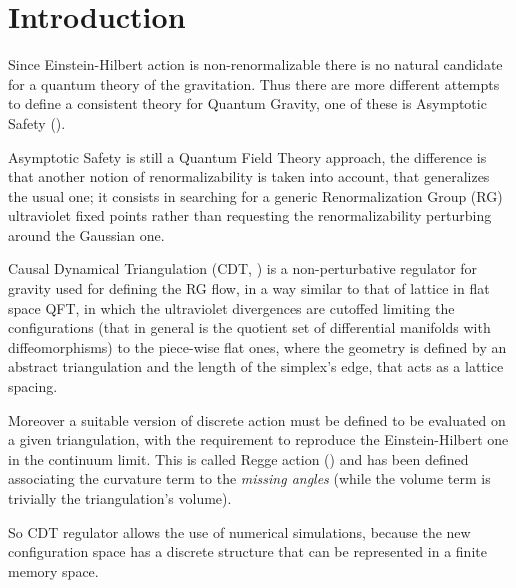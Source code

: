 
\cleardoublepage
{}

\chapter*{Introduction}
%
	{}


\indent Since Einstein-Hilbert action is non-renormalizable there is no natural candidate for a quantum theory of the gravitation. Thus there are more different attempts to define a consistent theory for Quantum Gravity, one of these is Asymptotic Safety (\cite{Weinberg1979}).
\newline

\indent Asymptotic Safety is still a Quantum Field Theory approach, the difference  is that another notion of renormalizability is taken into account, that generalizes the usual one; it consists in searching for a generic Renormalization Group (RG) ultraviolet fixed points rather than requesting the renormalizability perturbing around the Gaussian one.

Causal Dynamical Triangulation (CDT, \cite{Ambjorn2012}) is a non-perturbative regulator for gravity used for defining the RG flow, in a way similar to that of lattice in flat space QFT, in which the ultraviolet divergences are cutoffed limiting the configurations (that in general is the quotient set of differential manifolds with diffeomorphisms) to the piece-wise flat ones, where the geometry is defined by an abstract triangulation and the length of the simplex's edge, that acts as a lattice spacing.

Moreover a suitable version of discrete action must be defined to be evaluated on a given triangulation, with the requirement to reproduce the Einstein-Hilbert one in the continuum limit. This is called Regge action (\cite{Regge1961}) and has been defined associating the curvature term to the \textit{missing angles} (while the volume term is trivially the triangulation's volume).
\newline

\indent So CDT regulator allows the use of numerical simulations, because the new configuration space has a discrete structure that can be represented in a finite memory space.

